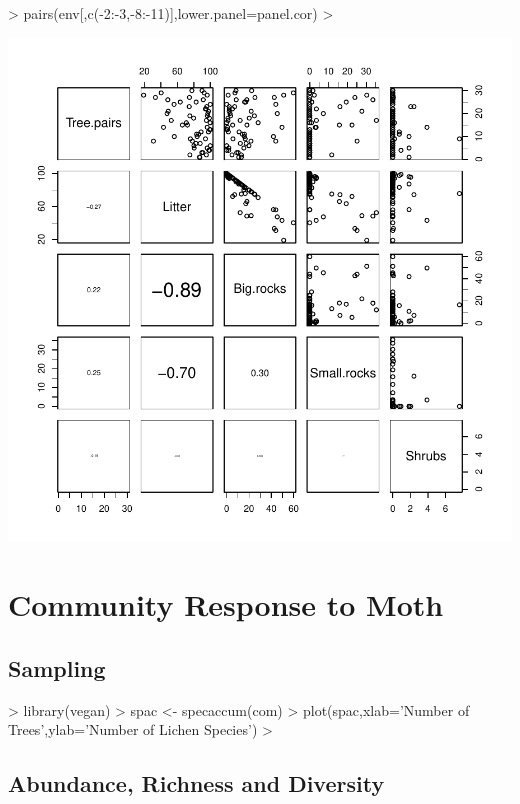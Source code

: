 \documentclass[12pt]{article}
\begin{document}
\begin{Schunk}
\begin{Sinput}
>   pairs(env[,c(-2:-3,-8:-11)],lower.panel=panel.cor)
> 
\end{Sinput}
\end{Schunk}
\includegraphics{SCRL-005}

\section{Community Response to Moth}

\subsection{Sampling}

\begin{Schunk}
\begin{Sinput}
> library(vegan)
> spac <- specaccum(com)
> plot(spac,xlab='Number of Trees',ylab='Number of Lichen Species')
> 
\end{Sinput}
\end{Schunk}

\subsection{Abundance, Richness and Diversity}
\end{document}
